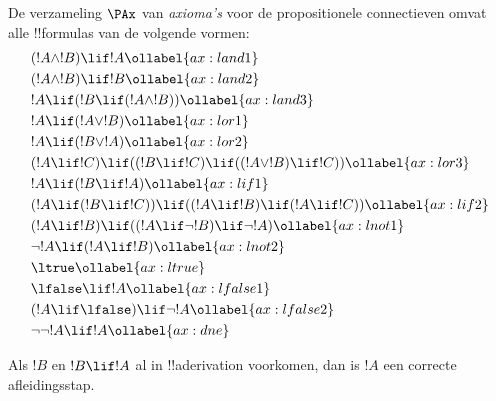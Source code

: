 \documentclass[openany]{memoir}
\begin{document}
\begingroup
\def\olfilename{OLP-0114}
\def\olfilepath{content/first-order-logic/axiomatic-deduction/}
\hypertarget{unit-OLP-0114}{}



      {}
      {}


\begin{defn}[Axioma's]
De verzameling $\PAx$ van \emph{axioma's} voor de propositionele
connectieven omvat alle !!{formula}s van de volgende vormen:
\begin{align}
  & (!A \land !B) \lif !A \ollabel{ax:land1}\\
  & (!A \land !B) \lif !B \ollabel{ax:land2}\\
  & !A \lif (!B \lif (!A \land !B)) \ollabel{ax:land3}\\
  & !A \lif (!A \lor !B) \ollabel{ax:lor1}\\
  & !A \lif (!B \lor !A) \ollabel{ax:lor2}\\
  & (!A \lif !C) \lif ((!B \lif !C) \lif ((!A \lor !B) \lif !C)) \ollabel{ax:lor3}\\
  & !A \lif (!B \lif !A) \ollabel{ax:lif1}\\
  & (!A \lif (!B \lif !C)) \lif ((!A \lif !B) \lif (!A \lif !C)) \ollabel{ax:lif2}\\
  & (!A \lif !B) \lif ((!A \lif \lnot !B) \lif \lnot !A) \ollabel{ax:lnot1}\\
  & \lnot !A \lif (!A \lif !B) \ollabel{ax:lnot2}\\
  & \ltrue \ollabel{ax:ltrue}\\
  & \lfalse \lif !A \ollabel{ax:lfalse1}\\
  & (!A \lif \lfalse) \lif \lnot !A \ollabel{ax:lfalse2}\\
  & \lnot\lnot !A \lif !A \ollabel{ax:dne}
\end{align}
\end{defn}

\begin{defn}
  Als $!B$ en $!B \lif !A$ al in !!a{derivation} voorkomen, dan is
  $!A$ een correcte afleidingsstap.
\end{defn}
\end{document}
